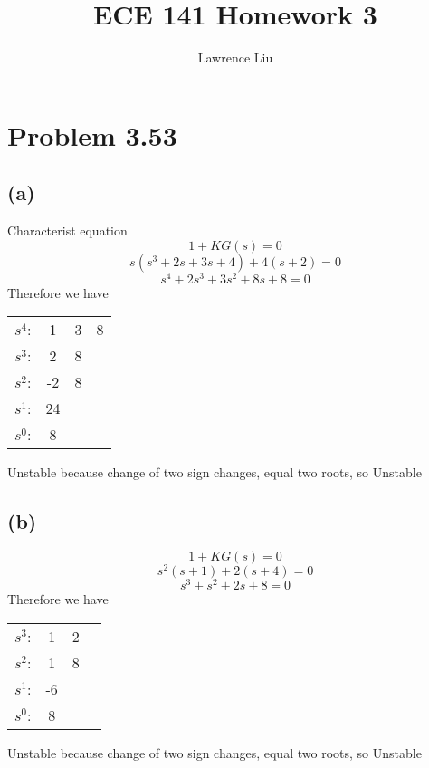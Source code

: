 \documentclass[12pt]{article}
\title{ECE 141 Homework 3}
\author{Lawrence Liu}
\begin{document}
\maketitle
\section*{Problem 3.53}
\subsection*{(a)}
Characterist equation
$$1+KG(s)=0$$
$$s(s^3+2s+3s+4)+4(s+2)=0$$
$$s^4+2s^3+3s^2+8s+8=0$$
Therefore we have
\begin{center}
    \begin{tabular}{ c c c c} 
     $s^4$: & 1 & 3 &  8\\ 
     $s^3$: & 2 & 8 &  \\ 
     $s^2$: & -2 & 8&\\
     $s^1$:  & 24 & &\\
     $s^0$: & 8 & &
\end{tabular} 
\end{center}
Unstable because change of two sign changes, equal two roots, so Unstable
\subsection*{(b)}
$$1+KG(s)=0$$
$$s^2(s+1)+2(s+4)=0$$
$$s^3+s^2+2s+8=0$$
Therefore we have
\begin{center}
    \begin{tabular}{ c c c c} 
     $s^3$: & 1 & 2 &\\ 
     $s^2$: & 1 & 8&  \\ 
     $s^1$: & -6 & &\\
     $s^0$:  & 8 & &
\end{tabular} 
\end{center}
Unstable because change of two sign changes, equal two roots, so Unstable

    
\end{document}
